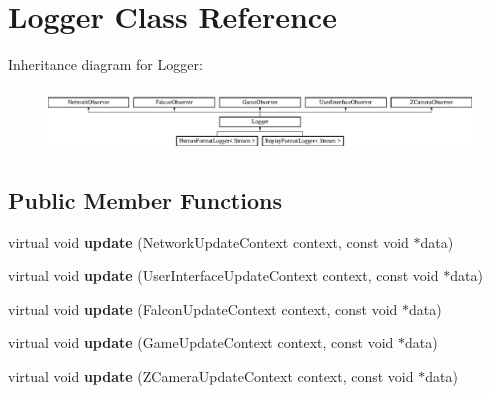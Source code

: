 \hypertarget{classLogger}{
\section{Logger Class Reference}
\label{classLogger}
}
Inheritance diagram for Logger:\begin{figure}[H]
\begin{center}
\leavevmode
\includegraphics[height=1.67164cm]{classLogger}
\end{center}
\end{figure}
\subsection*{Public Member Functions}
\begin{DoxyCompactItemize}
\item 
\hypertarget{classLogger_abb5098f19a132e91034a6974ed1f2e51}{
virtual void {\bfseries update} (NetworkUpdateContext context, const void $\ast$data)}
\label{classLogger_abb5098f19a132e91034a6974ed1f2e51}

\item 
\hypertarget{classLogger_ab346038a6b7f284d8f57d1296dd98079}{
virtual void {\bfseries update} (UserInterfaceUpdateContext context, const void $\ast$data)}
\label{classLogger_ab346038a6b7f284d8f57d1296dd98079}

\item 
\hypertarget{classLogger_afe25b23b7f952e183f1361ac572800c4}{
virtual void {\bfseries update} (FalconUpdateContext context, const void $\ast$data)}
\label{classLogger_afe25b23b7f952e183f1361ac572800c4}

\item 
\hypertarget{classLogger_a812b14b0d0d04bdc2b30f73bf84790bb}{
virtual void {\bfseries update} (GameUpdateContext context, const void $\ast$data)}
\label{classLogger_a812b14b0d0d04bdc2b30f73bf84790bb}

\item 
\hypertarget{classLogger_a9ac2396edcab7a8ff751bc3bd5a1dd33}{
virtual void {\bfseries update} (ZCameraUpdateContext context, const void $\ast$data)}
\label{classLogger_a9ac2396edcab7a8ff751bc3bd5a1dd33}

\end{DoxyCompactItemize}
